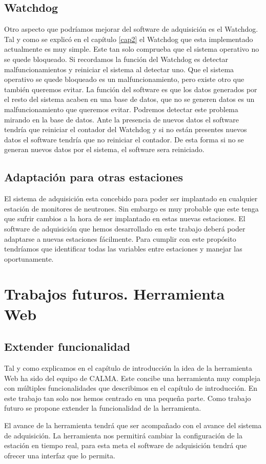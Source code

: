 	\subsection{Watchdog}
	Otro aspecto que podríamos mejorar del software de adquisición es el Watchdog. Tal y como se explicó en el capítulo \ref{cap2} el Watchdog que esta
	implementado actualmente es muy simple. Este tan solo comprueba que el sistema operativo no se quede bloqueado. Si recordamos la función del
	Watchdog es detectar malfuncionamientos y reiniciar el sistema al detectar uno. Que el sistema operativo se quede bloqueado es un
	malfuncionamiento, pero existe otro que también queremos evitar. La función del software es que los datos generados por el resto del sistema
	acaben en una base de datos, que no se generen datos es un malfuncionamiento que queremos evitar. Podremos detectar este problema mirando en
	la base de datos. Ante la presencia de nuevos datos el software tendría que reiniciar el contador del Watchdog y si no están presentes nuevos
	datos el software tendría que no reiniciar el contador. De esta forma si no se generan nuevos datos por el sistema, el software sera
	reiniciado.
	\subsection{Adaptación para otras estaciones}
	El sistema de adquisición esta concebido para poder ser implantado en cualquier estación de monitores de neutrones. Sin embargo es muy
	probable que este tenga que sufrir cambios a la hora de ser implantado en estas nuevas estaciones. El software de adquisición que hemos
	desarrollado en este trabajo deberá poder adaptarse a nuevas estaciones fácilmente. Para cumplir con este propósito tendríamos que
	identificar todas las variables entre estaciones y manejar las oportunamente.
\section{Trabajos futuros. Herramienta Web}
	\subsection{Extender funcionalidad}
	Tal y como explicamos en el capítulo de introducción la idea de la herramienta Web ha sido del equipo de CALMA. Este concibe una herramienta
	muy compleja con múltiples funcionalidades que describimos en el capítulo de introducción. En este trabajo tan solo nos hemos centrado en una
	pequeña parte. Como trabajo futuro se propone extender la funcionalidad de la herramienta.
	\par
	El avance de la herramienta tendrá que ser acompañado con el avance del sistema de adquisición. La herramienta nos permitirá cambiar la
	configuración de la estación en tiempo real, para esta meta el software de adquisición tendrá que ofrecer una interfaz que lo permita.
